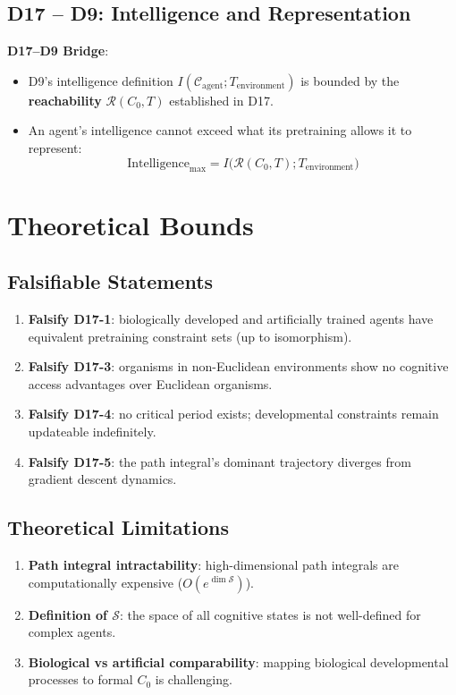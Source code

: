 \documentclass[12pt, a4paper]{article}
\begin{document}
\subsection{D17 -- D9: Intelligence and Representation}

\textbf{D17--D9 Bridge}:
\begin{itemize}
    \item D9's intelligence definition $I(\mathcal{C}_{\mathrm{agent}}; T_{\mathrm{environment}})$ is bounded by the \textbf{reachability} $\mathcal{R}(C_0, T)$ established in D17.
    \item An agent's intelligence cannot exceed what its pretraining allows it to represent:
    \[
    \mathrm{Intelligence}_{\mathrm{max}} = I\big(\mathcal{R}(C_0, T); T_{\mathrm{environment}}\big)
    \]
\end{itemize}

\section{Theoretical Bounds}

\subsection{Falsifiable Statements}
\begin{enumerate}
    \item \textbf{Falsify D17-1}: biologically developed and artificially trained agents have equivalent pretraining constraint sets (up to isomorphism).
    \item \textbf{Falsify D17-3}: organisms in non-Euclidean environments show no cognitive access advantages over Euclidean organisms.
    \item \textbf{Falsify D17-4}: no critical period exists; developmental constraints remain updateable indefinitely.
    \item \textbf{Falsify D17-5}: the path integral's dominant trajectory diverges from gradient descent dynamics.
\end{enumerate}

\subsection{Theoretical Limitations}
\begin{enumerate}
    \item \textbf{Path integral intractability}: high-dimensional path integrals are computationally expensive ($O(e^{\dim \mathcal{S}})$).
    \item \textbf{Definition of $\mathcal{S}$}: the space of all cognitive states is not well-defined for complex agents.
    \item \textbf{Biological vs artificial comparability}: mapping biological developmental processes to formal $C_0$ is challenging.
\end{enumerate}
\end{document}
